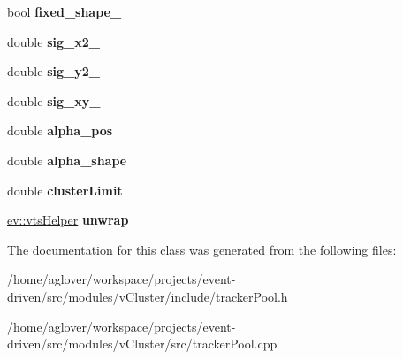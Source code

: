 \begin{DoxyCompactItemize}
\item 
bool {\bfseries fixed\+\_\+shape\+\_\+}\hypertarget{classTrackerPool_af83ad39640f58a747253b85046083140}{}\label{classTrackerPool_af83ad39640f58a747253b85046083140}

\item 
double {\bfseries sig\+\_\+x2\+\_\+}\hypertarget{classTrackerPool_a6a92ea09387253159839324143b6206a}{}\label{classTrackerPool_a6a92ea09387253159839324143b6206a}

\item 
double {\bfseries sig\+\_\+y2\+\_\+}\hypertarget{classTrackerPool_a3181cb8343949ab80181c9028ae114fa}{}\label{classTrackerPool_a3181cb8343949ab80181c9028ae114fa}

\item 
double {\bfseries sig\+\_\+xy\+\_\+}\hypertarget{classTrackerPool_a9018c85457b2616efe8f718f1602b32a}{}\label{classTrackerPool_a9018c85457b2616efe8f718f1602b32a}

\item 
double {\bfseries alpha\+\_\+pos}\hypertarget{classTrackerPool_ad67aaae3b2c777330ccb4abb9bf60884}{}\label{classTrackerPool_ad67aaae3b2c777330ccb4abb9bf60884}

\item 
double {\bfseries alpha\+\_\+shape}\hypertarget{classTrackerPool_ad134dda445a2b5eea2d2101a6e5c2132}{}\label{classTrackerPool_ad134dda445a2b5eea2d2101a6e5c2132}

\item 
double {\bfseries cluster\+Limit}\hypertarget{classTrackerPool_a6c9e6cdff31c0ab40c19f54d30d315cc}{}\label{classTrackerPool_a6c9e6cdff31c0ab40c19f54d30d315cc}

\item 
\hyperlink{classev_1_1vtsHelper}{ev\+::vts\+Helper} {\bfseries unwrap}\hypertarget{classTrackerPool_afec5b627c70b35454cecd812b3913c59}{}\label{classTrackerPool_afec5b627c70b35454cecd812b3913c59}

\end{DoxyCompactItemize}


The documentation for this class was generated from the following files\+:\begin{DoxyCompactItemize}
\item 
/home/aglover/workspace/projects/event-\/driven/src/modules/v\+Cluster/include/tracker\+Pool.\+h\item 
/home/aglover/workspace/projects/event-\/driven/src/modules/v\+Cluster/src/tracker\+Pool.\+cpp\end{DoxyCompactItemize}
